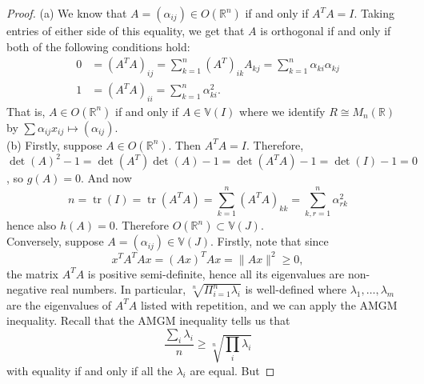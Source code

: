 \documentclass[reqno]{amsart}
\theoremstyle{definition}
\theoremstyle{remark}
\DeclareMathOperator{\tr}{tr}
\begin{document}
    \begin{proof}
        (a) We know that $A = 
        \left( \alpha_{ij} \right)
        \in O \left( \mathbb{R}^{n} \right) $ if and only
        if $A^{T} A = I$.
        Taking entries of either side of this equality, we
        get that $A$ is orthogonal if and only if
        both of the following conditions hold:
        \begin{align*}
            0 &= \left( A^{T}A \right)_{ij}
            = \sum_{k=1}^{n} \left( A^{T} \right)_{ik}
            A_{kj}
            = \sum_{k=1}^{n} \alpha_{ki} \alpha_{kj}\\
            1 &= \left( A^{T}A \right)_{ii}
            = \sum_{k=1}^{n} \alpha_{ki}^2.
        \end{align*}
        That is,
        $A \in O\left( \mathbb{R}^{n} \right) $ if and
        only if
        $A \in \mathbb{V} (I)$ where we identify
        $R \cong M_{n} \left( \mathbb{R} \right) $ by
        $\sum \alpha_{ij} x_{ij}
        \mapsto \left( \alpha_{ij} \right) $.\\
        \linebreak
        (b) Firstly, suppose
        $A \in O \left( \mathbb{R}^{n} \right) $.
        Then $A^{T}A = I$. Therefore,
        $\det (A)^2 -1 = 
        \det (A^{T}) \det (A) -1
        = \det (A^{T}A) -1 
        = \det (I) - 1
        = 0$, so
        $g(A) = 0$. And now
        \[
        n = \tr (I) = \tr (A^{T}A)
        = \sum_{k=1}^{n} \left( A^{T}A \right)_{kk}
        = \sum_{k,r=1}^{n} \alpha_{rk}^2
        \] 
        hence also $h(A) = 0$.
        Therefore
        $O \left( \mathbb{R}^{n} \right) 
        \subset \mathbb{V} (J)$.\\
        Conversely,
        suppose
        $A = \left( \alpha_{ij} \right)  \in \mathbb{V}(J)$.
        Firstly, note that since
        \[
        x^{T} A^{T}A x
        = \left( Ax \right)^{T} Ax
        = \|Ax\|^2 \ge 0,
        \] 
        the matrix $A^{T}A$ is positive semi-definite,
        hence all its eigenvalues are non-negative real numbers.
        In particular,
        $\sqrt[n]{\Pi_{i=1}^{n} \lambda_i} $ is well-defined
        where
        $\lambda_1, \ldots, \lambda_m$ are the eigenvalues
        of $A^{T}A$ listed
        with repetition, and
        we can apply the AMGM inequality.
        Recall that the AMGM inequality
        tells us that
        \[
        \frac{\sum_i \lambda_i}{n} \ge 
        \sqrt[n]{\prod_i \lambda_i} 
        \] 
        with equality if and only if all the
        $\lambda_i$ are equal. But 

\end{proof}
\end{document}
